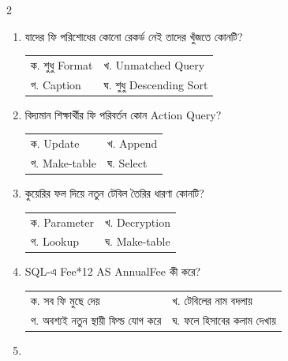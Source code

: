 \begin{multicols}{2}
\begin{enumerate}[resume]
\begin{minipage}[t]{\linewidth}
\end{minipage}
\vspace{1pt}
\item \begin{minipage}[t]{\linewidth}
যাদের ফি পরিশোধের কোনো রেকর্ড নেই তাদের খুঁজতে কোনটি?
\par
\begin{tabularx}{\linewidth}{@{}X X@{}}
ক. শুধু Format & খ. Unmatched Query \\
গ. Caption & ঘ. শুধু Descending Sort \\
\end{tabularx}
\end{minipage}
\vspace{1pt}
\item \begin{minipage}[t]{\linewidth}
বিদ্যমান শিক্ষার্থীর ফি পরিবর্তন কোন Action Query?
\par
\begin{tabularx}{\linewidth}{@{}X X@{}}
ক. Update & খ. Append \\
গ. Make-table & ঘ. Select \\
\end{tabularx}
\end{minipage}
\vspace{1pt}
\item \begin{minipage}[t]{\linewidth}
কুয়েরির ফল দিয়ে নতুন টেবিল তৈরির ধারণা কোনটি?
\par
\begin{tabularx}{\linewidth}{@{}X X@{}}
ক. Parameter & খ. Decryption \\
গ. Lookup & ঘ. Make-table \\
\end{tabularx}
\end{minipage}
\vspace{1pt}
\item \begin{minipage}[t]{\linewidth}
SQL-এ Fee*12 AS AnnualFee কী করে?
\par
\begin{tabularx}{\linewidth}{@{}X X@{}}
ক. সব ফি মুছে দেয় & খ. টেবিলের নাম বদলায় \\
গ. অবশ্যই নতুন স্থায়ী ফিল্ড যোগ করে & ঘ. ফলে হিসাবের কলাম দেখায় \\
\end{tabularx}
\end{minipage}
\vspace{1pt}
\item \begin{minipage}[t]{\linewidth}

\end{minipage}
\end{enumerate}
\end{multicols}

